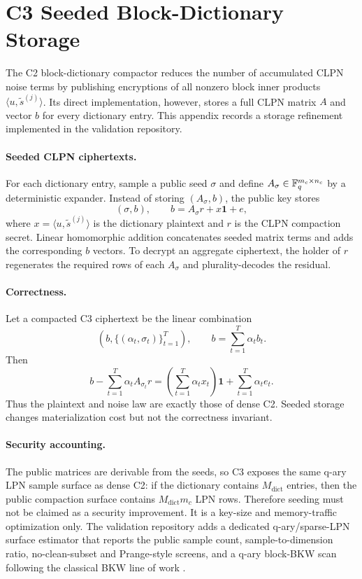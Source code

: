 \section{C3 Seeded Block-Dictionary Storage}
\label{app:c3-seeded}

The C2 block-dictionary compactor reduces the number of accumulated CLPN noise
terms by publishing encryptions of all nonzero block inner products
$\langle u,\tilde{s}^{(j)}\rangle$.  Its direct implementation, however, stores a
full CLPN matrix $A$ and vector $b$ for every dictionary entry.  This appendix
records a storage refinement implemented in the validation repository.

\paragraph{Seeded CLPN ciphertexts.}
For each dictionary entry, sample a public seed $\sigma$ and define
$A_\sigma\in\mathbb{F}_q^{m_c\times n_c}$ by a deterministic expander.  Instead of
storing $(A_\sigma,b)$, the public key stores
\[
  (\sigma,b),
  \qquad
  b=A_\sigma r + x\mathbf{1}+e,
\]
where $x=\langle u,\tilde{s}^{(j)}\rangle$ is the dictionary plaintext and $r$
is the CLPN compaction secret.  Linear homomorphic addition concatenates seeded
matrix terms and adds the corresponding $b$ vectors.  To decrypt an aggregate
ciphertext, the holder of $r$ regenerates the required rows of each
$A_\sigma$ and plurality-decodes the residual.

\paragraph{Correctness.}
Let a compacted C3 ciphertext be the linear combination
\[
  (b,\{(\alpha_t,\sigma_t)\}_{t=1}^T),
  \qquad
  b=\sum_{t=1}^T\alpha_t b_t .
\]
Then
\[
  b-\sum_{t=1}^T\alpha_t A_{\sigma_t}r
  =\left(\sum_{t=1}^T\alpha_t x_t\right)\mathbf{1}
   +\sum_{t=1}^T\alpha_t e_t .
\]
Thus the plaintext and noise law are exactly those of dense C2.  Seeded storage
changes materialization cost but not the correctness invariant.

\paragraph{Security accounting.}
The public matrices are derivable from the seeds, so C3 exposes the same q-ary
LPN sample surface as dense C2: if the dictionary contains $M_{\mathrm{dict}}$ entries,
then the public compaction surface contains $M_{\mathrm{dict}}m_c$ LPN rows.  Therefore
seeding must not be claimed as a security improvement.  It is a key-size and
memory-traffic optimization only.  The validation repository adds a dedicated
q-ary/sparse-LPN surface estimator that reports the public sample count,
sample-to-dimension ratio, no-clean-subset and Prange-style screens, and a
q-ary block-BKW scan following the classical BKW line of work
\cite{BlumKalaiWasserman2003,LevieilFouque2006,BogosEtAl2015,EsserEtAl2017LPNDecoded}.

